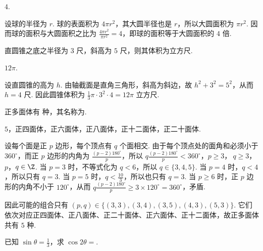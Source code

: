 \begin{answer}
\(4\).
\end{answer}

\begin{solution}
设球的半径为 \(r\). 球的表面积为 \(4\pi r^{2}\)，其大圆半径也是 \(r\)，所以大圆面积为 \(\pi r^{2}\). 因而球的面积与大圆面积之比为 \(\frac{4\pi r^{2}}{\pi r^{2}}=4\)，即球的面积等于大圆面积的 \(4\) 倍.
\end{solution}

\begin{problem}
直圆锥之底之半径为 \(3\text{ 尺}\)，斜高为 \(5\text{ 尺}\)，则其体积为\fillinblank{}\(\text{立方尺}\).
\end{problem}

\begin{answer}
\(12\pi\).
\end{answer}

\begin{solution}
设直圆锥的高为 \(h\). 由轴截面是直角三角形，斜高为斜边，故 \(h^{2}+3^{2}=5^{2}\)，从而 \(h=4\text{ 尺}\). 因此圆锥体积为 \(\frac13\pi\cdot3^{2}\cdot4=12\pi\text{ 立方尺}\).
\end{solution}

\begin{problem}
正多面体有\fillinblank{} 种，其名称为\fillinblank{}.
\end{problem}

\begin{answer}
\(5\)，正四面体，正六面体，正八面体，正十二面体，正二十面体.
\end{answer}

\begin{solution}
设每个面是正 \(p\) 边形，每个顶点有 \(q\) 个面相交. 由于每个顶点处的面角和必须小于 \(360^{\circ}\)，而正 \(p\) 边形的内角为 \(\frac{(p-2)180^{\circ}}{p}\)，所以
\(q\frac{(p-2)180^{\circ}}{p}<360^{\circ}\)，\(p\ge3\)，\(\ q\ge3\)，\(p\)，\(q\in\Z\).
当 \(p=3\) 时，不等式化为 \(q<6\)，所以 \(q\in\{3,4,5\}\). 当 \(p=4\) 时，\(q<4\)，所以只有 \(q=3\). 当 \(p=5\) 时，\(q<\frac{10}{3}\)，所以也只有 \(q=3\). 当 \(p\ge6\) 时，正 \(p\) 边形的内角不小于 \(120^{\circ}\)，从而 \(q\frac{(p-2)180^{\circ}}{p}\ge3\times120^{\circ}=360^{\circ}\)，矛盾.

因此可能的组合只有 \((p,q)\in\{(3,3),(3,4),(3,5),(4,3),(5,3)\}\). 它们依次对应正四面体、正八面体、正二十面体、正六面体、正十二面体，故正多面体共有 \(5\) 种.
\end{solution}

\begin{problem}
已知 \(\sin \theta = \frac{1}{3}\)，求 \(\cos 2\theta=\)\fillinblank{}.
\end{problem}

